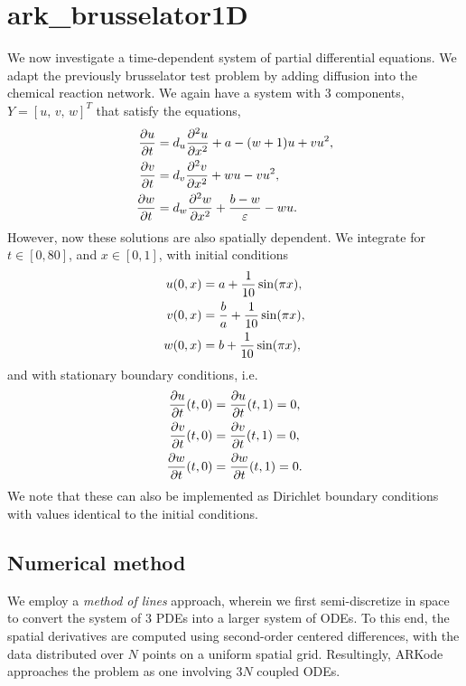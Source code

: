 \documentclass[letterpaper,10pt,english]{sphinxmanual}
\begin{document}
\chapter{ark\_brusselator1D}
\label{ark_brusselator1D:ark-brusselator1d}\label{ark_brusselator1D::doc}\label{ark_brusselator1D:id1}
We now investigate a time-dependent system of partial differential
equations.  We adapt the previously brusselator test problem by adding
diffusion into the chemical reaction network.  We again have a system
with 3 components, $Y = [u,\, v,\, w]^T$ that satisfy the equations,
\begin{gather}
\begin{split}\frac{\partial u}{\partial t} &= d_u \frac{\partial^2 u}{\partial
   x^2} + a - (w+1) u + v u^2, \\
\frac{\partial v}{\partial t} &= d_v \frac{\partial^2 v}{\partial
   x^2} + w u - v u^2, \\
\frac{\partial w}{\partial t} &= d_w \frac{\partial^2 w}{\partial
   x^2} + \frac{b-w}{\varepsilon} - w u.\end{split}\notag
\end{gather}
However, now these solutions are also spatially dependent.  We
integrate for $t \in [0, 80]$, and $x \in [0, 1]$, with
initial conditions
\begin{gather}
\begin{split}u(0,x) &=  a + \frac{1}{10} \sin(\pi x),\\
v(0,x) &= \frac{b}{a} + \frac{1}{10}\sin(\pi x),\\
w(0,x) &=  b + \frac{1}{10}\sin(\pi x),\end{split}\notag
\end{gather}
and with stationary boundary conditions, i.e.
\begin{gather}
\begin{split}\frac{\partial u}{\partial t}(t,0) &= \frac{\partial u}{\partial t}(t,1) = 0,\\
\frac{\partial v}{\partial t}(t,0) &= \frac{\partial v}{\partial t}(t,1) = 0,\\
\frac{\partial w}{\partial t}(t,0) &= \frac{\partial w}{\partial t}(t,1) = 0.\end{split}\notag
\end{gather}
We note that these can also be implemented as Dirichlet boundary
conditions with values identical to the initial conditions.


\section{Numerical method}
\label{ark_brusselator1D:numerical-method}
We employ a \emph{method of lines} approach, wherein we first
semi-discretize in space to convert the system of 3 PDEs into a larger
system of ODEs.  To this end, the spatial derivatives are computed
using second-order centered differences, with the data distributed
over $N$ points on a uniform spatial grid.  Resultingly, ARKode
approaches the problem as one involving $3N$ coupled ODEs.
\end{document}
